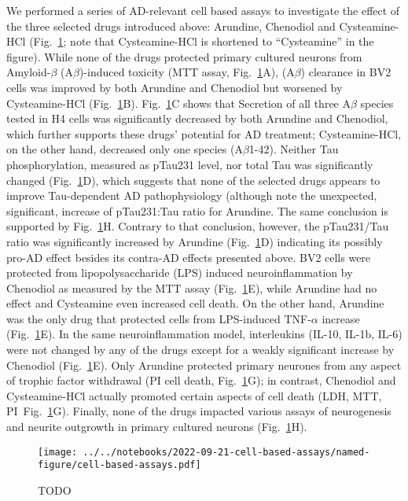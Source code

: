 \documentclass[letterpaper]{article}
\begin{document}
We performed a series of AD-relevant cell based assays to investigate the
effect of the three selected drugs introduced above: Arundine, Chenodiol and
Cysteamine-HCl (Fig.~\ref{fig:cell-based-assays}; note that Cysteamine-HCl is
shortened to ``Cysteamine'' in the figure).  While none of the drugs protected
primary cultured neurons from Amyloid-$\beta$ (A$\beta$)-induced toxicity (MTT
assay, Fig.~\ref{fig:cell-based-assays}A), (A$\beta$) clearance in BV2 cells
was improved by both Arundine and Chenodiol but worsened by Cysteamine-HCl
(Fig.~\ref{fig:cell-based-assays}B).  Fig.~\ref{fig:cell-based-assays}C shows
that Secretion of all three A$\beta$ species tested in H4 cells was
significantly decreased by both Arundine and Chenodiol, which further supports
these drugs' potential for AD treatment; Cysteamine-HCl, on the other hand,
decreased only one species (A$\beta$1-42).  Neither Tau phosphorylation,
measured as pTau231 level, nor total Tau was significantly changed
(Fig.~\ref{fig:cell-based-assays}D), which suggests that none of the selected
drugs appears to improve Tau-dependent AD pathophysiology (although note the
unexpected, significant, increase of pTau231:Tau ratio for Arundine.  The same
conclusion is supported by Fig.~\ref{fig:cell-based-assays}H. Contrary to that
conclusion, however, the pTau231/Tau ratio was significantly increased by
Arundine (Fig.~\ref{fig:cell-based-assays}D) indicating its possibly pro-AD
effect besides its contra-AD effects presented above.  BV2 cells were
protected from lipopolysaccharide (LPS) induced neuroinflammation by Chenodiol
as measured by the MTT assay (Fig.~\ref{fig:cell-based-assays}E), while
Arundine had no effect and Cysteamine even increased cell death.  On the other
hand, Arundine was the only drug that protected cells from LPS-induced
TNF-$\alpha$ increase (Fig.~\ref{fig:cell-based-assays}E).  In the same
neuroinflammation model, interleukins (IL-10, IL-1b, IL-6) were not changed by
any of the drugs except for a weakly significant increase by Chenodiol
(Fig.~\ref{fig:cell-based-assays}E).  Only Arundine protected primary neurones
from any aspect of trophic factor withdrawal (PI cell death,
Fig.~\ref{fig:cell-based-assays}G); in contrast, Chenodiol and Cysteamine-HCl
actually promoted certain aspects of cell death (LDH, MTT,
PI~Fig.~\ref{fig:cell-based-assays}G).  Finally, none of the drugs impacted
various assays of neurogenesis and neurite outgrowth in primary cultured
neurons (Fig.~\ref{fig:cell-based-assays}H).

\begin{figure}
\texttt{[image: ../../notebooks/2022-09-21-cell-based-assays/named-figure/cell-based-assays.pdf]}
\caption{TODO
}
\label{fig:cell-based-assays}
\end{figure}
\end{document}

